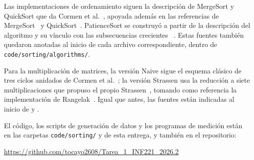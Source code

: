 Las implementaciones de ordenamiento siguen la descripción de MergeSort y
QuickSort que da Cormen et al.~\cite{cormen2009}, apoyada además en las
referencias de MergeSort~\cite{wikipedia_mergesort} y
QuickSort~\cite{wikipedia_quicksort}. PatienceSort se construyó a partir de
la descripción del algoritmo y su vínculo con las subsecuencias crecientes
~\cite{aldous1999patience,wikipedia_patience_sorting}. Estas fuentes también
quedaron anotadas al inicio de cada archivo correspondiente, dentro de
\texttt{code/sorting/algorithms/}.

Para la multiplicación de matrices, la versión Naive sigue el esquema
clásico de tres ciclos anidados de Cormen et al.~\cite{cormen2009}; la
versión Strassen usa la reducción a siete multiplicaciones que propuso el
propio Strassen~\cite{strassen1969}, tomando como referencia la
implementación de Rangelak~\cite{rangelak_strassen}. Igual que antes, las
fuentes están indicadas al inicio de
 y
.

El código, los scripts de generación de datos y los programas de medición
están en las carpetas \texttt{code/sorting/} y
 de esta entrega, y también en el
repositorio:

\begin{center}
\url{https://github.com/tocayo2608/Tarea_1_INF221_2026.2}
\end{center}